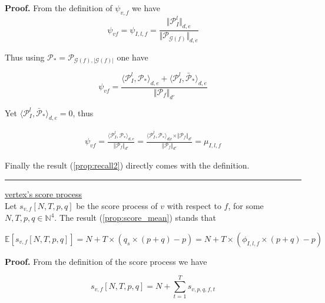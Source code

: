 \documentclass[a4paper, 11pt]{article}
\begin{document}
\textbf{Proof.} From the definition of $\psi_{v, f}$ we have \\

\begin{equation*}
\psi_{v f} = \psi_{I, l, f} = \frac{\Vert \mathcal{P}^{l}_I \Vert_{d, e}}{\Vert \mathcal{P}_{\mathcal{G}(f)} \Vert_{d, e}}
\end{equation*}

Thus using $\mathcal{P}_{*} = \mathcal{P}_{\mathcal{G}(f), \vert \mathcal{G}(f) \vert}$ one have


\begin{equation*}
\psi_{v f} = \frac{\langle \mathcal{P}^{l}_I, \mathcal{P}_{*} \rangle_{d, e} + \langle \mathcal{P}^{l}_I, \bar{\mathcal{P}}_{*} \rangle_{d, e}}{\Vert \mathcal{P}_{f} \Vert_{d'}}
\end{equation*}

Yet $\langle \mathcal{P}^{l}_I, \bar{\mathcal{P}}_{*} \rangle_{d, e} = 0$, thus 
 
\begin{align*}
\psi_{v f} = \frac{\langle \mathcal{P}^{l}_I, \mathcal{P}_{*} \rangle_{d, e}}{\Vert \mathcal{P}_{f} \Vert_{d'}} = \frac{\langle \mathcal{P}^{l}_I, \mathcal{P}_{*} \rangle_{d \vert e} \times \Vert \mathcal{P}_f \Vert_{d'}}{\Vert \mathcal{P}_{f} \Vert_{d'}} = \mu_{I, l, f} 
\end{align*}

Finally the result (\ref{prop:recall2}) directly comes with the definition.
\begin{center}
\rule[0pt]{100pt}{1pt} 
\end{center}

\underline{vertex's score process}\\

Let $s_{v, f}[N, T, p, q]$ be the score process of $v$ with respect to $f$, for some  $N, T, p, q \in \mathbb{N}^4$. The result (\ref{prop:score_mean}) stands that

\begin{equation*}
\mathbb{E} \left[ s_{v, f}[N, T, p, q]  \right] = N + T \times (q_s\times (p + q) - p) = N + T \times (\phi_{I, l, f} \times (p + q) - p)
\end{equation*}


\textbf{Proof.} From the definition of the score process we have 

\begin{equation*}
s_{v, f}[N, T, p, q] = N + \sum_{t=1}^{T} s_{v, p, q, f, t}
\end{equation*}
\end{document}
